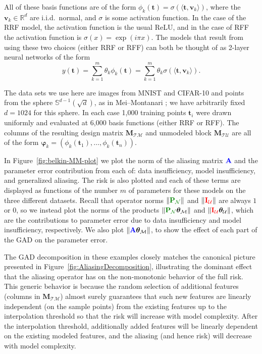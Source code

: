\documentclass[twocolumn,aps,prx,superscriptaddress,10pt]{revtex4-2}
\newcommand{\bt}{\bm{t}}
\newcommand{\bv}{\bm{v}}
\newcommand{\0}{\bm{0}}
\newcommand{\bphi}{\boldsymbol{\varphi}}
\newcommand{\btheta}{\boldsymbol{\theta}}
\newcommand{\M}{\mathcal{M}} %
\newcommand{\K}{\mathcal{N}} %
\newcommand{\T}{\mathcal{T}} %
\newcommand{\U}{\mathcal{U}} %
\newcommand{\bbA}{{\color{blue}{\mathbf{A}}}}  %
\newcommand{\bbIU}{{\color{red}{\bbI_{\U}}}}  %
\newcommand{\bbPN}{{\color{Green}{\mathbf{P}_{\K}}}} %
\newcommand{\bbI}{\mathbf{I}}
\newcommand{\bbM}{\mathbf{M}}
\newcommand{\MTM}{\bbM_{\T\M}}
\newcommand{\MTU}{\bbM_{\T\U}}
\newcommand{\R}{\mathbb{R}}
\begin{document}
All of these basis functions are of the form $\phi_k(\bt) = \sigma(\langle \bt, \bv_k \rangle)$, where the $\bv_k\in \R^d$ are i.i.d.~normal, 
and $\sigma$ is some activation function. 
In the case of the RRF model, the activation function is the usual ReLU, and in the case of RFF the activation function is $\sigma(x) = \exp(i \pi x)$.  The models that result from using these two choices (either RRF or RFF) can both be thought of as 2-layer neural networks of the form 
\[
y(\bt) = \sum_{k=1}^m \theta_k \phi_k(\bt) = \sum_{k=1}^m \theta_k \sigma(\langle \bt, \bv_k \rangle).
\]

The data sets we use here are images from MNIST and CIFAR-10 and points from the sphere $\mathbb{S}^{d-1}(\sqrt{d})$, as in Mei--Montanari \cite{MeiMontanari}; we have arbitrarily fixed $d=1024$ for this sphere.  In each case 1,000 training points $\bt_i$ were drawn uniformly and evaluated at 6,000 basis functions (either RRF or RFF).  
The columns of the resulting design matrix $\MTM$ and unmodeled block $\MTU$ are all of the form 
$\bphi_k = (\phi_k(\bt_1), \dots, \phi_k(\bt_n))$. 

In Figure~\ref{fig:belkin-MM-plot} we plot the norm of the aliasing matrix $\bbA$ and the parameter error contribution from each of: data insufficiency, model insufficiency, and generalized aliasing.  
The risk is also plotted  and each of these terms are displayed as functions of the number $m$ of parameters for these models on the three different datasets.
Recall that operator norms $\|\bbPN\|$ and $\|\bbIU\|$ are always $1$ or $0$, so we instead plot the norms of the products $\|\bbPN \btheta_{\M}\|$ and $\|\bbIU \btheta_{\U}\|$, which are the contributions to parameter error due to data insufficiency and model insufficiency, respectively.  We also plot $\|\bbA \btheta_{\M}\|$, to show the effect of each part of the GAD on the parameter error.  

The GAD decomposition in these examples closely matches the canonical picture presented in Figure~\ref{fig:AliasingDecomposition}, illustrating the dominant effect that the aliasing operator has on the non-monotonic behavior of the full risk.  This generic behavior is because the random selection of additional features (columns in $\MTM$) almost surely guarantees that such new features are linearly independent (on the sample points) from the existing features up to the interpolation threshold so that the risk will increase with model complexity.  After the interpolation threshold, additionally added features will be linearly dependent on the existing modeled features, and the aliasing (and hence risk) will decrease with model complexity.
\end{document}
